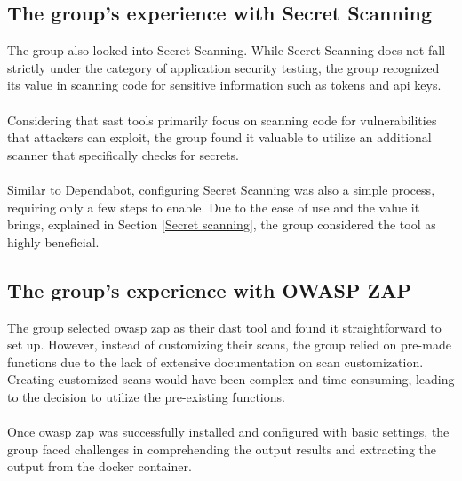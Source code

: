 \subsection{The group's experience with Secret Scanning}
The group also looked into Secret Scanning. While Secret Scanning does not fall strictly under the category of application security testing, the group recognized its value in scanning code for sensitive information such as tokens and \acrshort{api} keys.
\\~\\
Considering that \acrshort{sast} tools primarily focus on scanning code for vulnerabilities that attackers can exploit, the group found it valuable to utilize an additional scanner that specifically checks for secrets.
\\~\\
Similar to Dependabot, configuring Secret Scanning was also a simple process, requiring only a few steps to enable. Due to the ease of use and the value it brings, explained in Section \ref{Secret scanning}, the group considered the tool as highly beneficial.

\subsection{The group's experience with OWASP ZAP}
The group selected \acrshort{owasp} \acrshort{zap} as their \acrshort{dast} tool and found it straightforward to set up. However, instead of customizing their scans, the group relied on pre-made functions due to the lack of extensive documentation on scan customization. Creating customized scans would have been complex and time-consuming, leading to the decision to utilize the pre-existing functions.
\\~\\
Once \acrshort{owasp} \acrshort{zap} was successfully installed and configured with basic settings, the group faced challenges in comprehending the output results and extracting the output from the docker container.


